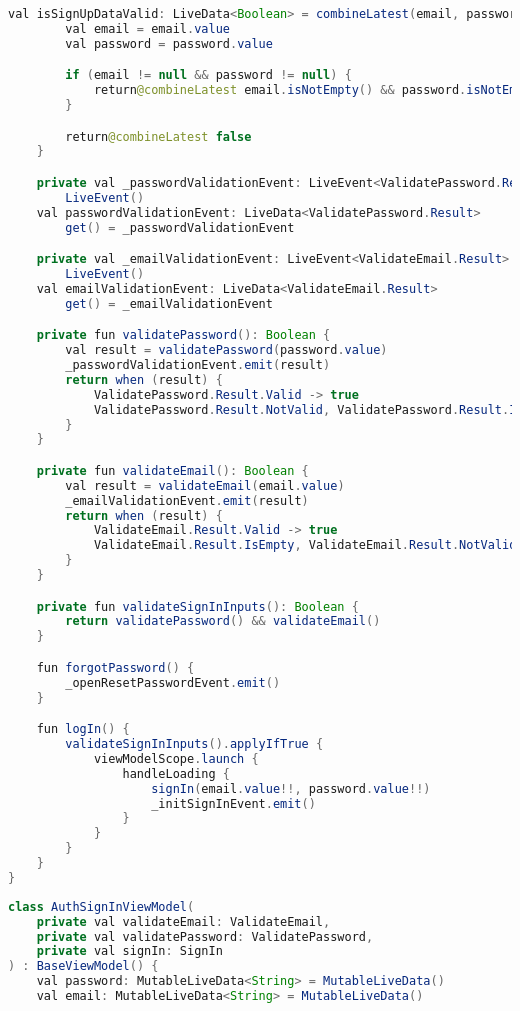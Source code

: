 \begin{asection}
\begin{lstlisting}[language=Java,label={lst:add:a_6}, caption={AuthSignInViewModel}]
    val isSignUpDataValid: LiveData<Boolean> = combineLatest(email, password) {
        val email = email.value
        val password = password.value

        if (email != null && password != null) {
            return@combineLatest email.isNotEmpty() && password.isNotEmpty()
        }

        return@combineLatest false
    }

    private val _passwordValidationEvent: LiveEvent<ValidatePassword.Result> =
        LiveEvent()
    val passwordValidationEvent: LiveData<ValidatePassword.Result>
        get() = _passwordValidationEvent

    private val _emailValidationEvent: LiveEvent<ValidateEmail.Result> =
        LiveEvent()
    val emailValidationEvent: LiveData<ValidateEmail.Result>
        get() = _emailValidationEvent

    private fun validatePassword(): Boolean {
        val result = validatePassword(password.value)
        _passwordValidationEvent.emit(result)
        return when (result) {
            ValidatePassword.Result.Valid -> true
            ValidatePassword.Result.NotValid, ValidatePassword.Result.IsEmpty -> false
        }
    }

    private fun validateEmail(): Boolean {
        val result = validateEmail(email.value)
        _emailValidationEvent.emit(result)
        return when (result) {
            ValidateEmail.Result.Valid -> true
            ValidateEmail.Result.IsEmpty, ValidateEmail.Result.NotValid -> false
        }
    }

    private fun validateSignInInputs(): Boolean {
        return validatePassword() && validateEmail()
    }

    fun forgotPassword() {
        _openResetPasswordEvent.emit()
    }

    fun logIn() {
        validateSignInInputs().applyIfTrue {
            viewModelScope.launch {
                handleLoading {
                    signIn(email.value!!, password.value!!)
                    _initSignInEvent.emit()
                }
            }
        }
    }
}
\end{lstlisting}
\hfill \break
\begin{lstlisting}[language=Java,label={lst:add:a_7}, caption={GestureDetectorCompat}]
class AuthSignInViewModel(
    private val validateEmail: ValidateEmail,
    private val validatePassword: ValidatePassword,
    private val signIn: SignIn
) : BaseViewModel() {
    val password: MutableLiveData<String> = MutableLiveData()
    val email: MutableLiveData<String> = MutableLiveData()


\end{lstlisting}
\end{asection}
